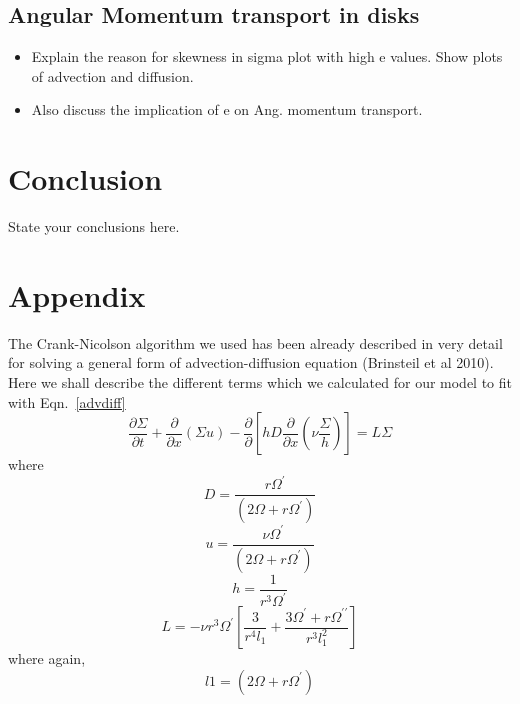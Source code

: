 \documentclass[useAMS,usenatbib]{mn2e}
\begin{document}
\subsection{Angular Momentum transport in disks}
\begin{itemize}
\item Explain the reason for skewness in sigma plot with high e
  values. Show plots of advection and diffusion. 
\item Also discuss the implication of e on Ang. momentum transport. 
\end{itemize}
\section{Conclusion}
State your conclusions here. 
\section*{Appendix}
The Crank-Nicolson algorithm we used has been already described in very detail for solving a general form of advection-diffusion equation (Brinsteil et al 2010). Here we shall describe the different terms which we calculated for our model to fit with Eqn.~\ref{advdiff}  
\begin{equation}
\frac{\partial\Sigma}{\partial t} + \frac{\partial}{\partial x}(\Sigma u) - \frac{\partial}{\partial}\left[h D\frac{\partial}{\partial x}\left(\nu\frac{\Sigma}{h}\right)\right] = L\Sigma
\label{advdiff}
\end{equation}
where
\begin{equation}
D = \frac{r\Omega^\prime}{\left(2\Omega + r\Omega^\prime\right)}
\end{equation}
\begin{equation}
u = \frac{\nu\Omega^\prime}{\left(2\Omega + r\Omega^\prime\right)}
\end{equation}
\begin{equation}
h = \frac{1}{r^3\Omega^\prime}
\end{equation}
\begin{equation}
L = -\nu r^3\Omega^\prime\left[\frac{3}{r^4 l_1} +\frac{3\Omega^\prime + r\Omega^{\prime\prime}}{r^3l_1^2}\right]
\end{equation}
where again,
\begin{equation}
l1 = (2\Omega + r\Omega^\prime)
\end{equation}
\label{lastpage}
\end{document}
